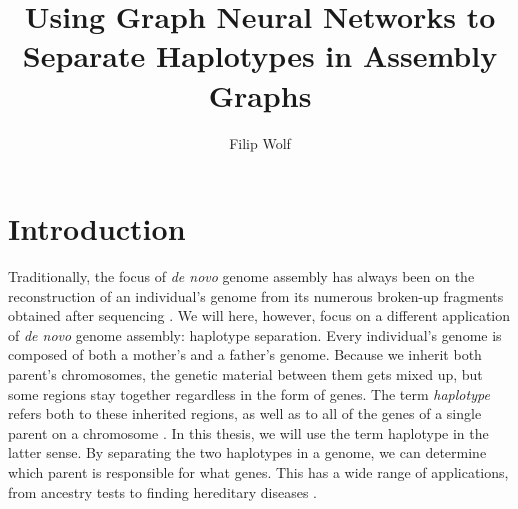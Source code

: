 \documentclass[times, utf8, diplomski, english]{fer_eng}
\begin{document}

\title{Using Graph Neural Networks to Separate Haplotypes in Assembly Graphs}

\author{Filip Wolf}

\maketitle



\zahvala{}

\tableofcontents

\chapter{Introduction}

Traditionally, the focus of \textit{de novo} genome assembly has always been on the reconstruction of an individual's genome from its numerous broken-up fragments obtained after sequencing \cite{de_novo2}. We will here, however, focus on a different application of \textit{de novo} genome assembly: haplotype separation. Every individual's genome is composed of both a mother's and a father's genome. Because we inherit both parent's chromosomes, the genetic material between them gets mixed up, but some regions stay together regardless in the form of genes. The term \textit{haplotype} refers both to these inherited regions, as well as to all of the genes of a single parent on a chromosome \cite{haplotype}. In this thesis, we will use the term haplotype in the latter sense. By separating the two haplotypes in a genome, we can determine which parent is responsible for what genes. This has a wide range of applications, from ancestry tests to finding hereditary diseases \cite{haplotype_usage}.         
\end{document}
